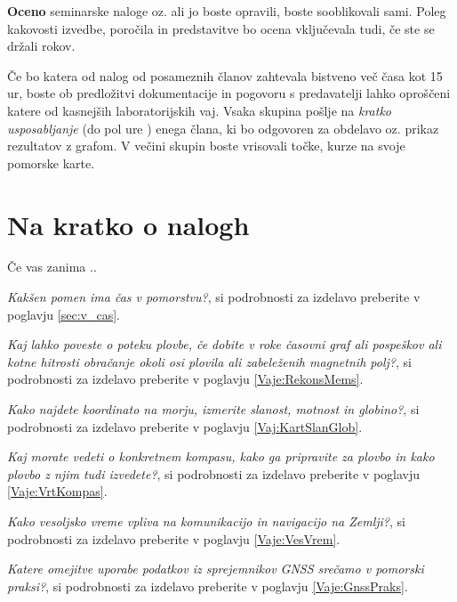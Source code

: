 \textbf{Oceno} seminarske naloge oz. ali jo boste opravili, boste sooblikovali sami. Poleg kakovosti izvedbe, poročila in predstavitve bo ocena vključevala tudi, če ste se držali rokov. 

Če bo katera od nalog od posameznih članov zahtevala bistveno več časa kot 15 ur, boste ob predložitvi dokumentacije in pogovoru s predavatelji lahko oproščeni katere od kasnejših laboratorijskih vaj. Vsaka skupina pošlje na \textit{kratko usposabljanje} (do pol ure ) enega člana, ki bo odgovoren za obdelavo oz. prikaz rezultatov z grafom. V večini skupin boste vrisovali točke, kurze na svoje pomorske karte.


\section*{Na kratko o nalogh}
Če vas zanima ..
\begin{prob}
	\label{Nal:SplNavCas}
	 \textit{Kakšen pomen ima čas v pomorstvu?}, si podrobnosti za izdelavo preberite v poglavju \ref{sec:v_cas}.
\end{prob}

\begin{prob}
	\label{Nal:SplNavMem}
	\textit{Kaj lahko poveste o poteku plovbe, če dobite v roke časovni graf ali pospeškov ali kotne hitrosti obračanje okoli osi plovila ali zabeleženih magnetnih polj?}, si podrobnosti za izdelavo preberite v poglavju \ref{Vaje:RekonsMems}.
\end{prob}


\begin{prob}
	\label{Nal:SplNavKart}
	\textit{Kako najdete koordinato na morju, izmerite slanost, motnost in globino?}, si podrobnosti za izdelavo preberite v poglavju \ref{Vaj:KartSlanGlob}.
\end{prob}

\begin{prob}
	\label{Nal:SplNavKomp}
	\textit{Kaj morate vedeti o konkretnem kompasu, kako ga pripravite za plovbo in kako plovbo z njim tudi izvedete?}, si podrobnosti za izdelavo preberite v poglavju \ref{Vaje:VrtKompas}.
\end{prob}

\begin{prob}
	\label{Nal:SplNavVes}
	\textit{Kako vesoljsko vreme vpliva na komunikacijo in navigacijo na Zemlji?}, si podrobnosti za izdelavo preberite v poglavju \ref{Vaje:VesVrem}.  
\end{prob}

\begin{prob}
	\label{Nal:SplNavGns}
	\textit{Katere omejitve uporabe podatkov iz sprejemnikov GNSS srečamo v pomorski praksi?}, si podrobnosti za izdelavo preberite v poglavju \ref{Vaje:GnssPraks}.
\end{prob}







%
